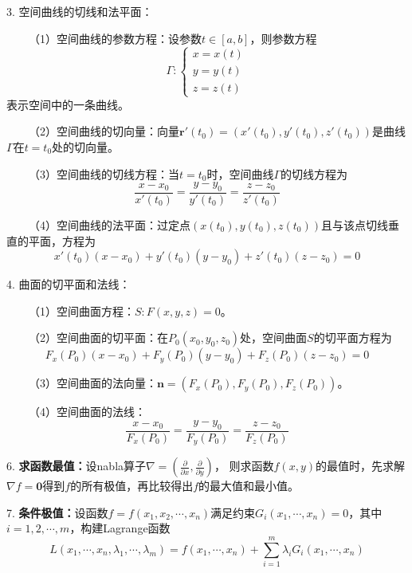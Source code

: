 3. 空间曲线的切线和法平面：

~~~~（1）空间曲线的参数方程：设参数$t\in[a,b]$，则参数方程
\begin{equation*}
    \Gamma:\left\{\begin{aligned}
        x=x(t)\\
        y=y(t)\\
        z=z(t)
    \end{aligned}\right.
\end{equation*}
表示空间中的一条曲线。

~~~~（2）空间曲线的切向量：向量$\boldsymbol{r}'(t_0)=\left(x'(t_0),y'(t_0),z'(t_0)\right)$是曲线$\Gamma$在$t=t_0$处的切向量。

~~~~（3）空间曲线的切线方程：当$t=t_0$时，空间曲线$\Gamma$的切线方程为
\begin{equation*}
    \frac{x-x_0}{x'(t_0)}=\frac{y-y_0}{y'(t_0)}=\frac{z-z_0}{z'(t_0)}
\end{equation*}

~~~~（4）空间曲线的法平面：过定点$\left(x(t_0),y(t_0),z(t_0)\right)$且与该点切线垂直的平面，方程为
\begin{equation*}
    x'(t_0)(x-x_0)+y'(t_0)(y-y_0)+z'(t_0)(z-z_0)=0
\end{equation*}

4. 曲面的切平面和法线：

~~~~（1）空间曲面方程：$S:F(x,y,z)=0$。

~~~~（2）空间曲面的切平面：在$P_0(x_0,y_0,z_0)$处，空间曲面$S$的切平面方程为
\begin{equation*}
    F_x(P_0)(x-x_0)+F_y(P_0)(y-y_0)+F_z(P_0)(z-z_0)=0
\end{equation*}

~~~~（3）空间曲面的法向量：$\boldsymbol{n}=\left(F_x(P_0),F_y(P_0),F_z(P_0)\right)$。

~~~~（4）空间曲面的法线：
\begin{equation*}
    \frac{x-x_0}{F_x(P_0)}=\frac{y-y_0}{F_y(P_0)}=\frac{z-z_0}{F_z(P_0)}
\end{equation*}

6. \textbf{求函数最值：}设nabla算子$\nabla =\left(\frac{\partial}{\partial x},\frac{\partial}{\partial y}\right)$，
则求函数$f(x,y)$的最值时，先求解$\nabla f = \boldsymbol{0}$得到$f$的所有极值，再比较得出$f$的最大值和最小值。


7. \textbf{条件极值：}设函数$f=f(x_1,x_2,\cdots,x_n)$满足约束$G_i(x_1,\cdots,x_n)=0$，其中$i=1,2,\cdots,m$，构建Lagrange函数
\begin{equation*}
    L(x_1,\cdots,x_n,\lambda_1,\cdots,\lambda_m)=f(x_1,\cdots,x_n)+\sum\limits_{i=1}^m \lambda_iG_i(x_1,\cdots,x_n)
\end{equation*}

